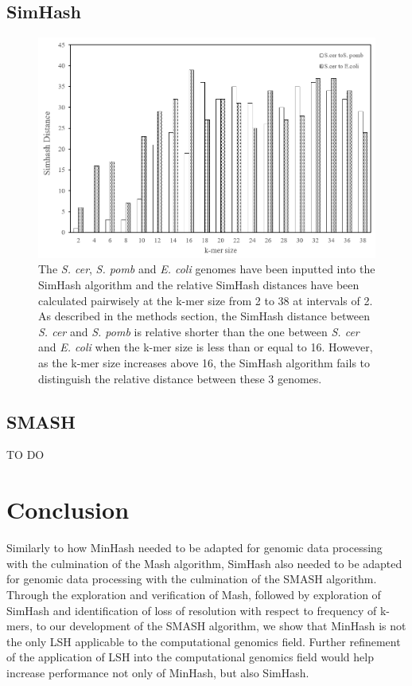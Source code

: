 \documentclass[12pt, letterpaper]{article}
\begin{document}
\subsection{SimHash}
\FloatBarrier
\begin{figure}[h!]
	\centering
	\includegraphics[width=1.0\textwidth]{Simhash_kmer_result.png}
	\caption{The \textit{S. cer}, \textit{S. pomb} and \textit{E. coli} genomes have been inputted into the SimHash algorithm and the relative SimHash distances have been calculated pairwisely at the k-mer size from 2 to 38 at intervals of 2. As described in the methods section, the SimHash distance between \textit{S. cer} and \textit{S. pomb} is relative shorter than the one between \textit{S. cer} and \textit{E. coli} when the k-mer size is less than or equal to 16. However, as the k-mer size increases above 16, the SimHash algorithm fails to distinguish the relative distance between these 3 genomes.}
	\label{fig:SimHashDescription}
\end{figure}
\FloatBarrier


\subsection{SMASH}
\color{red} TO DO \color{black}
\section{Conclusion}
Similarly to how MinHash needed to be adapted for genomic data processing with the culmination of the Mash algorithm, SimHash also needed to be adapted for genomic data processing with the culmination of the SMASH algorithm. Through the exploration and verification of Mash, followed by exploration of SimHash and identification of loss of resolution with respect to frequency of k-mers, to our development of the SMASH algorithm, we show that MinHash is not the only LSH applicable to the computational genomics field. Further refinement of the application of LSH into the computational genomics field would help increase performance not only of MinHash, but also SimHash.
\end{document}
